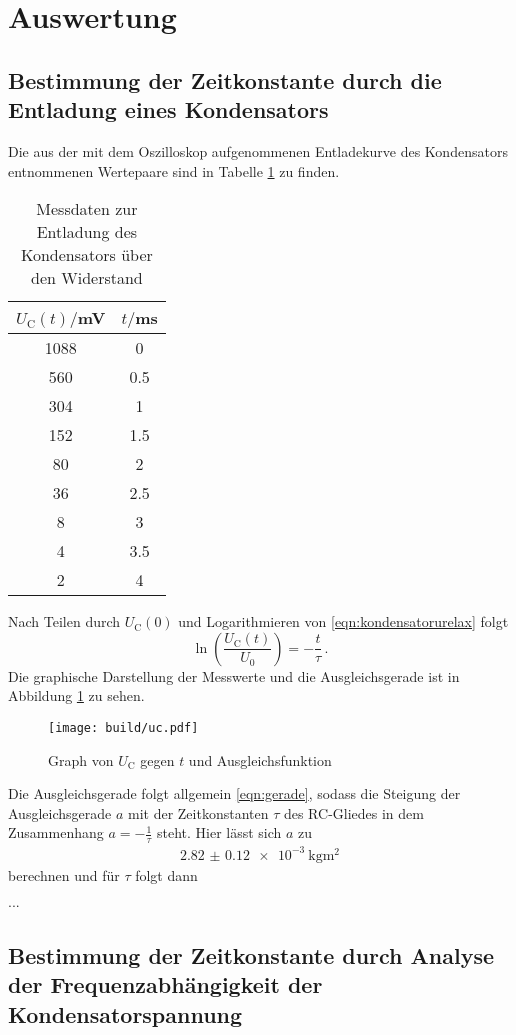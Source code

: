 \section{Auswertung}
\label{sec:Auswertung}
\subsection{Bestimmung der Zeitkonstante durch die Entladung eines Kondensators}
Die aus der mit dem Oszilloskop aufgenommenen Entladekurve des Kondensators
entnommenen Wertepaare sind in Tabelle \ref{tab:entladung} zu finden.

\begin{table}
\centering
\caption{Messdaten zur Entladung des Kondensators über den Widerstand}
\label{tab:entladung}
\begin{tabular}{c c}
\toprule
$U_\text{C}(t)/$mV & $t/$ms \\
\midrule
1088 &  0   \\
 560 &  0.5 \\
 304 &  1   \\
 152 &  1.5 \\
 80  &  2   \\
 36  &  2.5 \\
  8  &  3   \\
  4  &  3.5 \\
  2  &  4   \\
\bottomrule
\end{tabular}
\end{table}
Nach Teilen durch $U_\text{C}(0)$ und Logarithmieren von \eqref{eqn:kondensatorurelax} folgt
\begin{equation}
  \ln{\left(\frac{U_\mathrm{C}(t)}{U_0}\right)} = -\frac{t}{\tau}\,.
\end{equation}
Die graphische Darstellung der Messwerte und die Ausgleichsgerade ist in Abbildung \ref{fig:entladung}
zu sehen.
\begin{figure}
  \centering
  \texttt{[image: build/uc.pdf]}
  \caption{Graph von $U_\text{C}$ gegen $t$ und Ausgleichsfunktion}
  \label{fig:entladung}
\end{figure}
Die Ausgleichsgerade folgt allgemein \eqref{eqn:gerade}, sodass die Steigung der
Ausgleichsgerade $a$ mit der Zeitkonstanten $\tau$ des RC-Gliedes in dem Zusammenhang
$a = -\frac{1}{\tau}$ steht. Hier lässt sich $a$ zu
\begin{align}
  \SI{2.82(012)e-3}{\kilogram\meter\squared}
\end{align}
berechnen und für $\tau$ folgt dann
\begin{align}
\end{align}
...
\subsection{Bestimmung der Zeitkonstante durch Analyse der Frequenzabhängigkeit der Kondensatorspannung}
